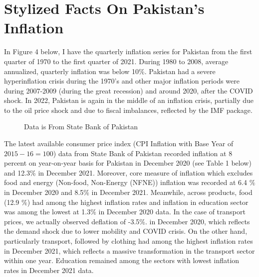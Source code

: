 \documentclass[12pt]{article}
\newcommand{\1}{\mathbbm 1}
\begin{document}
		
		
		
		
		
		
		
		
		
		
		
		\section{Stylized Facts On Pakistan's Inflation}
		
		In Figure 4 below, I have the quarterly inflation series for Pakistan from the first quarter of 1970 to the first quarter of 2021. During 1980 to 2008, average annualized, quarterly inflation was below 10\%. Pakistan had a severe hyperinflation crisis during the 1970's and other major inflation periods were during 2007-2009 (during the great recession) and around 2020, after the COVID shock. In 2022, Pakistan is again in the middle of an inflation crisis, partially due to the oil price shock and due to fiscal imbalances, reflected by the IMF package.
		
		
		
		
		
		
		
		
		\begin{figure}[H]
			\centering
			\scalebox{0.6}{}
			\hfill
			\caption{Data is From State Bank of Pakistan}
		\end{figure}
		
		
		
		
		
		The latest available consumer price index (CPI Inflation with Base Year of $2015-16 =100$) data from State Bank of Pakistan recorded inflation at 8 percent on year-on-year basis for Pakistan in December 2020 (see Table 1 below) and 12.3\% in December 2021. Moreover, core measure of inflation which excludes food and energy (Non-food, Non-Energy (NFNE)) inflation was recorded at 6.4 $\%$ in December 2020 and 8.5$\%$ in December 2021. Meanwhile, across products, food (12.9 $\%$) had among the highest inflation rates and inflation in education sector was among the lowest at 1.3$\%$ in December 2020 data. In the case of transport prices, we actually observed deflation of -3.5$\%$. in December 2020, which reflects the demand shock due to lower mobility and COVID crisis. On the other hand, particularly transport, followed by clothing had among the highest inflation rates in December 2021, which reflects a massive transformation in the transport sector within one year. Education remained among the sectors with lowest inflation rates in December 2021 data.
		
\end{document}
